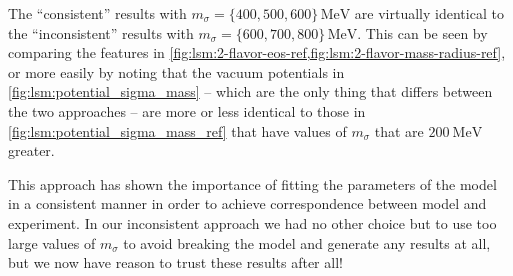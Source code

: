 The ``consistent'' results with $m_\sigma=\{400,500,600\} \, \si{\mega\electronvolt}$ are
virtually identical to the ``inconsistent'' results with $m_\sigma=\{600,700,800\} \, \si{\mega\electronvolt}$.
This can be seen by comparing the features in \cref{fig:lsm:2-flavor-eos-ref,fig:lsm:2-flavor-mass-radius-ref},
or more easily by noting that the vacuum potentials in \cref{fig:lsm:potential_sigma_mass}
-- which are the only thing that differs between the two approaches --
are more or less identical to those in \cref{fig:lsm:potential_sigma_mass_ref} that have values of $m_\sigma$ that are $\SI{200}{\mega\electronvolt}$ greater.

This approach has shown the importance of fitting the parameters of the model in a consistent manner in order to achieve correspondence between model and experiment.
In our inconsistent approach we had no other choice but to use too large values of $m_\sigma$ to avoid breaking the model and generate any results at all,
but we now have reason to trust these results after all!
